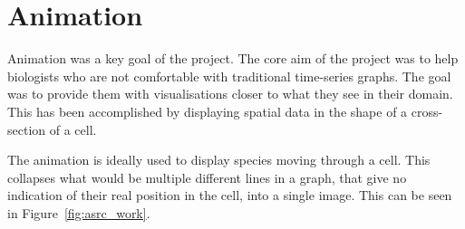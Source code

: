 


\section{Animation}
\label{sec:animation}

Animation was a key goal of the project.  The core aim of the project was to help biologists who are not comfortable with traditional time-series graphs.  The goal was to provide them with visualisations closer to what they see in their domain.  This has been accomplished by displaying spatial data in the shape of a cross-section of a cell.

The animation is ideally used to display species moving through a cell.  This collapses what would be multiple different lines in a graph, that give no indication of their real position in the cell, into a single image.  This can be seen in Figure~\ref{fig:asrc_work}.

